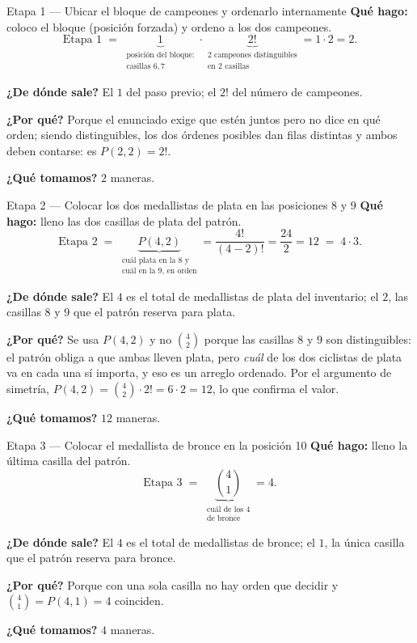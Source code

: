 \documentclass[11pt]{article}
\begin{document}
\begin{paso}{Etapa 1 --- Ubicar el bloque de campeones y ordenarlo internamente}
\textbf{Qu\'e hago:} coloco el bloque (posici\'on forzada) y ordeno a los dos campeones.
\[
\text{Etapa 1}\;=\;\underbrace{1}_{\substack{\text{posici\'on del bloque:}\\ \text{casillas }6,7}}
\cdot\underbrace{2!}_{\substack{\text{2 campeones distinguibles}\\ \text{en 2 casillas}}}=1\cdot 2=2 .
\]

\textbf{¿De d\'onde sale?} El $1$ del paso previo; el $2!$ del n\'umero de campeones.

\textbf{¿Por qu\'e?} Porque el enunciado exige que est\'en juntos pero no dice en qu\'e orden; siendo
distinguibles, los dos \'ordenes posibles dan filas distintas y ambos deben contarse: es $P(2,2)=2!$.

\textbf{¿Qu\'e tomamos?} $2$ maneras.
\end{paso}

\begin{paso}{Etapa 2 --- Colocar los dos medallistas de plata en las posiciones 8 y 9}
\textbf{Qu\'e hago:} lleno las dos casillas de plata del patr\'on.
\[
\text{Etapa 2}\;=\;\underbrace{P(4,2)}_{\substack{\text{cu\'al plata en la 8 y}\\ \text{cu\'al en la 9, en orden}}}
=\frac{4!}{(4-2)!}=\frac{24}{2}=12\;=\;4\cdot 3 .
\]

\textbf{¿De d\'onde sale?} El $4$ es el total de medallistas de plata del inventario; el $2$, las casillas
$8$ y $9$ que el patr\'on reserva para plata.

\textbf{¿Por qu\'e?} Se usa $P(4,2)$ y no $\binom{4}{2}$ porque las casillas $8$ y $9$ son distinguibles: el
patr\'on obliga a que ambas lleven plata, pero \emph{cu\'al} de los dos ciclistas de plata va en cada una
s\'i importa, y eso es un arreglo ordenado. Por el argumento de simetr\'ia, $P(4,2)=\binom{4}{2}\cdot 2!=6\cdot 2=12$,
lo que confirma el valor.

\textbf{¿Qu\'e tomamos?} $12$ maneras.
\end{paso}

\begin{paso}{Etapa 3 --- Colocar el medallista de bronce en la posici\'on 10}
\textbf{Qu\'e hago:} lleno la \'ultima casilla del patr\'on.
\[
\text{Etapa 3}\;=\;\underbrace{\binom{4}{1}}_{\substack{\text{cu\'al de los 4}\\ \text{de bronce}}}=4 .
\]

\textbf{¿De d\'onde sale?} El $4$ es el total de medallistas de bronce; el $1$, la \'unica casilla que el
patr\'on reserva para bronce.

\textbf{¿Por qu\'e?} Porque con una sola casilla no hay orden que decidir y $\binom{4}{1}=P(4,1)=4$
coinciden.

\textbf{¿Qu\'e tomamos?} $4$ maneras.
\end{paso}
\end{document}
